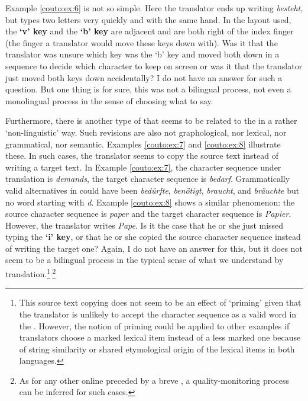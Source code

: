 \documentclass[output=paper]{LSP/langsci}
\begin{document}
Example \ref{couto:ex:6} is not so simple. Here the translator ends up writing \emph{besteht}, but types two letters very quickly and with the same hand. In the  layout used, the \textbf{`v' key} and the \textbf{`b' key} are adjacent and are both right of the index finger (the finger a translator would move these keys down with). Was it that the translator was unsure which key was the `b' key and moved both down in a sequence to decide which character to keep on screen or was it that the translator just moved both keys down accidentally? I do not have an answer for such a question. But one thing is for sure, this was not a bilingual process, not even a monolingual process in the sense of choosing what to say.

Furthermore, there is another type of  that seems to be related to the  in a rather `non-linguistic' way. Such revisions are also not graphological, nor lexical, nor grammatical, nor semantic. Examples \ref{couto:ex:7} and \ref{couto:ex:8} illustrate these. In such cases, the translator seems to copy the source text instead of writing a target text. In Example \ref{couto:ex:7}, the character sequence under translation is \emph{demands}, the target character sequence is \emph{bedarf}. Grammatically valid alternatives in  could have been \emph{bedürfte}, \emph{benötigt}, \emph{braucht}, and \emph{bräuchte} but no word starting with \emph{d}. Example \ref{couto:ex:8} shows a similar phenomenon: the source character sequence is \emph{paper} and the target character sequence is \emph{Papier}. However, the translator writes \emph{Pape}. Is it the case that he or she just missed typing the \textbf{`i' key}, or that he or she copied the source character sequence instead of writing the target one? Again, I do not have an answer for this, but it does not seem to be a bilingual process in the typical sense of what we understand by translation.\footnote{This source text copying does not seem to be an effect of `priming' given that the translator is unlikely to accept the  character sequence as a valid word in the . However, the notion of priming could be applied to other examples if translators choose a marked lexical item instead of a less marked one because of string similarity or shared etymological origin of the lexical items in both languages.}$^,$\footnote{As for any other online  preceded by a breve , a quality-monitoring process can be inferred for such cases.}
\end{document}
